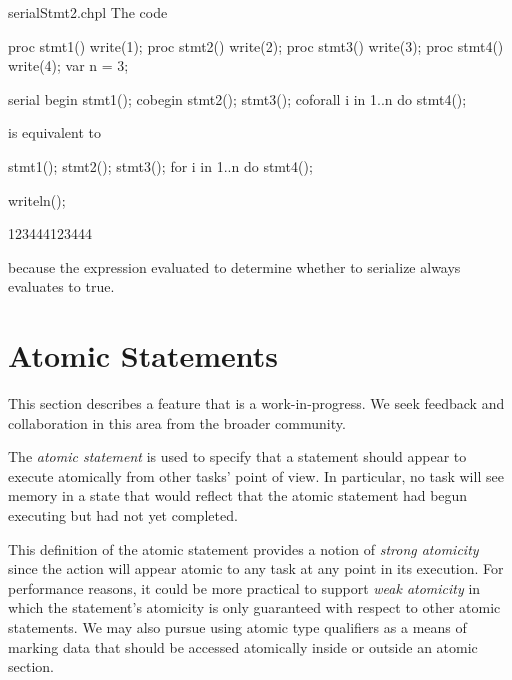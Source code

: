 \begin{chapelexample}{serialStmt2.chpl}
The code
\begin{chapelpre}
proc stmt1() { write(1); }
proc stmt2() { write(2); }
proc stmt3() { write(3); }
proc stmt4() { write(4); }
var n = 3;
\end{chapelpre}
\begin{chapel}
serial {
  begin stmt1();
  cobegin {
    stmt2();
    stmt3();
  }
  coforall i in 1..n do stmt4();
}
\end{chapel}
is equivalent to
\begin{chapel}
stmt1();
{
  stmt2();
  stmt3();
}
for i in 1..n do stmt4();
\end{chapel}
\begin{chapelpost}
writeln();
\end{chapelpost}
\begin{chapeloutput}
123444123444
\end{chapeloutput}
because the expression evaluated to determine whether to serialize
always evaluates to true.
\end{chapelexample}

\section{Atomic Statements}
\label{Atomic_Statement}

\begin{openissue}
  This section describes a feature that is a work-in-progress.  We seek feedback
  and collaboration in this area from the broader community.
\end{openissue}

The \emph{atomic statement} is used to specify that a statement should appear
to execute atomically from other tasks' point of view.
In particular, no task will see memory in a state that would reflect that
the atomic statement had begun executing but had not yet completed.

\begin{openissue}
  This definition of the atomic statement provides a notion of {\em
    strong atomicity} since the action will appear atomic to any task
  at any point in its execution.  For performance reasons, it could be
  more practical to support {\em weak atomicity} in which the
  statement's atomicity is only guaranteed with respect to other
  atomic statements.  We may also pursue using atomic type qualifiers
  as a means of marking data that should be accessed atomically inside
  or outside an atomic section.
\end{openissue}

